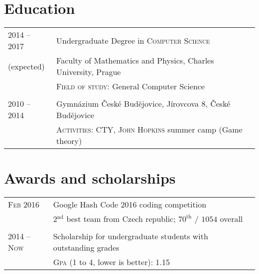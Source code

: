 \documentclass[a4paper,10pt]{article}
\newcommand{\rightcol}{11.2cm}
\newcommand{\leftcol}{2.8cm}
\begin{document}
\section{Education}
\begin{tabular}{p{\leftcol}|p{\rightcol}}
\textsc{2014 -- 2017} & Undergraduate Degree in \textsc{Computer Science}\\
{\footnotesize (expected)} &\normalsize{Faculty of Mathematics and Physics}, {Charles University}, Prague\\
                & \footnotesize{\textsc{Field of study:} {General Computer Science}}\\
\multicolumn{2}{c}{}\\
\textsc{2010 -- 2014} & {Gymnázium České Budějovice}, Jírovcova 8, České Budějovice\\
                & \footnotesize{\textsc{Activities:} \textsc{CTY, John Hopkins} summer camp (Game theory)}\\
                
\end{tabular}

\section{Awards and scholarships}
\begin{tabular}{p{\leftcol}|p{\rightcol}}

\textsc{Feb 2016} & {Google Hash Code 2016} coding competition\\
                    & \footnotesize{2$^{\text{nd}}$ best team from Czech republic; $70^{\text{th}}$ / $1054$ overall}\\

\multicolumn{2}{c}{}\\

\textsc{2014 -- Now} & Scholarship for undergraduate students with outstanding grades \\
                    & \footnotesize{\textsc{Gpa} (1 to 4, lower is better): 1.15}\\

\end{tabular}


\end{document}
